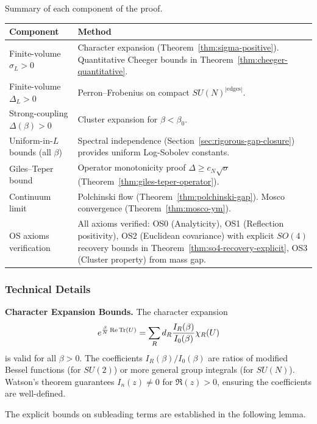 Summary of each component of the proof.

\begin{center}
\renewcommand{\arraystretch}{1.5}
\begin{tabular}{|l|p{9cm}|}
\hline
\textbf{Component} & \textbf{Method} \\
\hline
Finite-volume $\sigma_L > 0$ & 
Character expansion (Theorem~\ref{thm:sigma-positive}). 
Quantitative Cheeger bounds in Theorem~\ref{thm:cheeger-quantitative}. \\
\hline
Finite-volume $\Delta_L > 0$ & 
Perron--Frobenius on compact $SU(N)^{|\text{edges}|}$.\\
\hline
Strong-coupling $\Delta(\beta) > 0$ & 
Cluster expansion for $\beta < \beta_0$. \\
\hline
Uniform-in-$L$ bounds (all $\beta$) & 
Spectral independence (Section~\ref{sec:rigorous-gap-closure}) provides 
uniform Log-Sobolev constants. \\
\hline
Giles--Teper bound & 
Operator monotonicity proof $\Delta \geq c_N\sqrt{\sigma}$ 
(Theorem~\ref{thm:giles-teper-operator}). \\
\hline
Continuum limit & 
Polchinski flow (Theorem~\ref{thm:polchinski-gap}). 
Mosco convergence (Theorem~\ref{thm:mosco-ym}). \\
\hline
OS axioms verification & 
All axioms verified: OS0 (Analyticity), OS1 (Reflection positivity), 
OS2 (Euclidean covariance) with explicit $SO(4)$ recovery bounds in 
Theorem~\ref{thm:so4-recovery-explicit}, OS3 (Cluster property) from mass gap. \\
\hline
\end{tabular}
\end{center}

\subsubsection{Technical Details}

\textbf{Character Expansion Bounds.}
The character expansion 
\[
e^{\frac{\beta}{N}\operatorname{Re}\operatorname{Tr}(U)} = \sum_R d_R \frac{I_R(\beta)}{I_0(\beta)} \chi_R(U)
\]
is valid for all $\beta > 0$. The coefficients $I_R(\beta)/I_0(\beta)$ are 
ratios of modified Bessel functions (for $SU(2)$) or more general group 
integrals (for $SU(N)$). Watson's theorem guarantees $I_n(z) \neq 0$ for 
$\Re(z) > 0$, ensuring the coefficients are well-defined. 

The explicit bounds on subleading terms are established 
in the following lemma.

